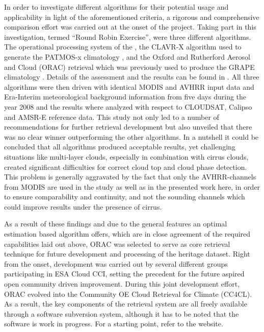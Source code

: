 \documentclass[amt]{style/copernicus}
\begin{document}
In order to investigate different algorithms for their potential usage and
applicability in light of the aforementioned criteria, a rigorous and
comprehensive comparison effort was carried out at the onset of the
project. Taking part in this investigation, termed ``Round Robin Exercise'',
were three different algorithms. The operational processing system of the \citet{CMSAF_web}, the CLAVR-X algorithm used to generate the PATMOS-x
climatology \citep{Heidinger13}, and the Oxford and Rutherford Aerosol and
Cloud (ORAC) retrieval \citep{Thomas09, Poulsen12} which was previously used to produce the GRAPE
climatology \citep{Thomas09_GRAPE, GRAPE_web}. Details of the assessment and the results can be found in \citet{Stengel15}. All three algorithms were then driven with identical MODIS and AVHRR input data and Era-Interim meteorological background information from five days during the year 2008 and the results where analyzed with respect to CLOUDSAT, Calipso and AMSR-E reference data. This study not only led to a number of recommendations for further retrieval development but also unveiled that there was no clear winner outperforming the other algorithms. In a nutshell it could be concluded that all algorithms produced acceptable results, yet challenging situations like multi-layer clouds, especially in combination with cirrus clouds, created significant difficulties for correct cloud top and cloud phase detection. This problem is generally aggravated by the fact that only the AVHRR-channels from MODIS are used in the study as well as in the presented work here, in order to ensure comparability and continuity, and not the sounding channels which could improve results under the presence of cirrus.

As a result of these findings and due to the general features an optimal
estimation based algorithm offers, which are in close agreement of the
required capabilities laid out above, ORAC was selected to serve as core
retrieval technique for future development and processing of the heritage
dataset. Right from the onset, development was carried out by several
different groups participating in ESA Cloud CCI, setting the precedent for the
future aspired open community driven improvement. During this joint
development effort, ORAC evolved into the Community OE Cloud Retrieval for
Climate (CC4CL). As a result, the key components of the retrieval system are
all freely available through a software subversion system, although it has to
be noted that the software is work in progress. For a starting point, refer to the
\citet{ORAC_web} website.
\end{document}
